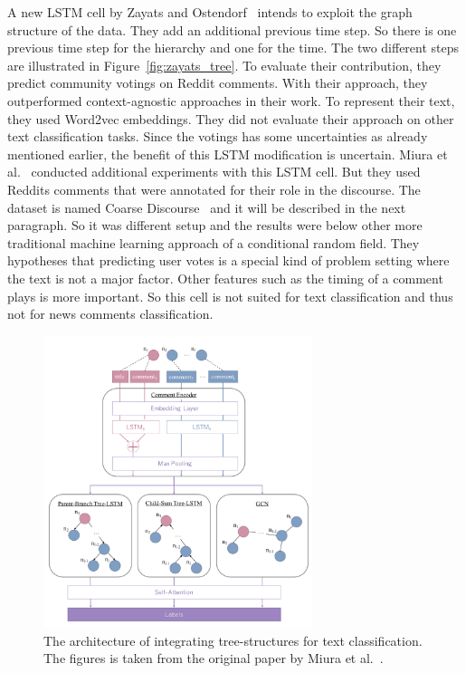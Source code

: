 A new LSTM cell by Zayats and Ostendorf~\cite{Q18-1009} intends to exploit the graph structure of the data. They add an additional previous time step. So there is one previous time step for the hierarchy and one for the time. The two different steps are illustrated in Figure~\ref{fig:zayats_tree}.
 To evaluate their contribution, they predict community votings on Reddit comments. With their approach, they outperformed context-agnostic approaches in their work. To represent their text, they used Word2vec embeddings. They did not evaluate their approach on other text classification tasks. Since the votings has some uncertainties as already mentioned earlier, the benefit of this LSTM modification is uncertain. Miura et al.~\cite{C18-1322} conducted additional experiments with this LSTM cell. But they used Reddits comments that were annotated for their role in the discourse.
 The dataset is named Coarse Discourse~\cite{coarsediscourse} and it will be described in the next paragraph.
So it was different setup and the results were below other more traditional machine learning approach of a conditional random field. They hypotheses that predicting user votes is a special kind of problem setting where the text is not a major factor. Other features such as the timing of a comment plays is more important. So this cell is not suited for text classification and thus not for news comments classification.
\begin{figure}
  \begin{center}
    \includegraphics[width=0.7\textwidth]{images/related_work/integrating_tree.png}
  \end{center}
  \caption{The architecture of integrating tree-structures for text classification. The figures is taken from the original paper by Miura et al.~\cite{C18-1322}.}
  \label{fig:integrating_tree_structure}
\end{figure}

